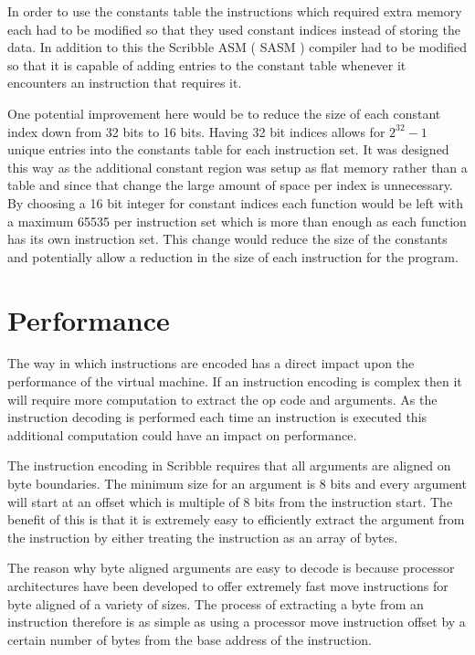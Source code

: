 \documentclass[]{final_report}
\begin{document}
In order to use the constants table the instructions which required extra memory each had to be modified so that they used constant indices instead of storing the data. In addition to this the Scribble ASM ( SASM ) compiler had to be modified so that it is capable of adding entries to the constant table whenever it encounters an instruction that requires it.

One potential improvement here would be to reduce the size of each constant index down from 32 bits to 16 bits. Having 32 bit indices allows for \begin{math}2^{32} - 1\end{math} unique entries into the constants table for each instruction set. It was designed this way as the additional constant region was setup as flat memory rather than a table and since that change the large amount of space per index is unnecessary. By choosing a 16 bit integer for constant indices each function would be left with a maximum 65535 per instruction set which is more than enough as each function has its own instruction set. This change would reduce the size of the constants and potentially allow a reduction in the size of each instruction for the program.

\section{Performance}

The way in which instructions are encoded has a direct impact upon the performance of the virtual machine. If an instruction encoding is complex then it will require more computation to extract the op code and arguments. As the instruction decoding is performed each time an instruction is executed this additional computation could have an impact on performance.

The instruction encoding in Scribble requires that all arguments are aligned on byte boundaries. The minimum size for an argument is 8 bits and every argument will start at an offset which is multiple of 8 bits from the instruction start. The benefit of this is that it is extremely easy to efficiently extract the argument from the instruction by either treating the instruction as an array of bytes.

The reason why byte aligned arguments are easy to decode is because processor architectures have been developed to offer extremely fast move instructions for byte aligned of a variety of sizes. The process of extracting a byte from an instruction therefore is as simple as using a processor move instruction offset by a certain number of bytes from the base address of the instruction.
\end{document}
